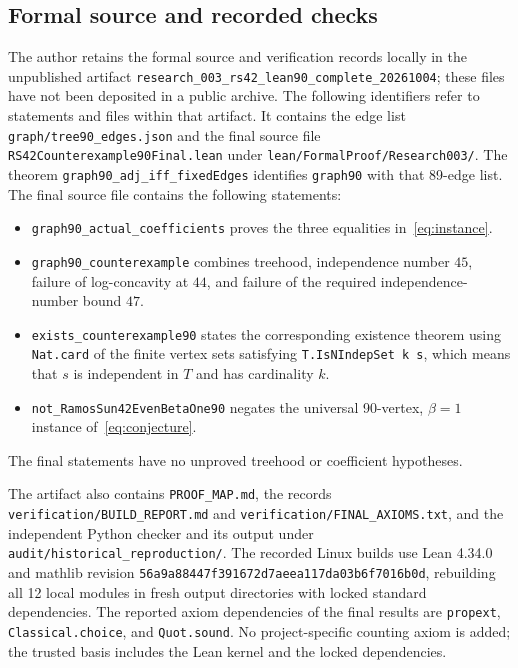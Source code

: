 \documentclass[11pt,a4paper]{article}
\theoremstyle{remark}
\numberwithin{equation}{section}
\begin{document}
\subsection{Formal source and recorded checks}\label{app:formal-record}

The author retains the formal source and verification records locally
in the unpublished artifact
\nolinkurl{research_003_rs42_lean90_complete_20261004}; these files
have not been deposited in a public archive. The following identifiers
refer to statements and files within that artifact.
It contains the edge list \nolinkurl{graph/tree90_edges.json} and
the final source file \nolinkurl{RS42Counterexample90Final.lean}
under \nolinkurl{lean/FormalProof/Research003/}.
The theorem \nolinkurl{graph90_adj_iff_fixedEdges} identifies
\nolinkurl{graph90} with that 89-edge list.
The final source file contains the following statements:
\begin{itemize}
\item \nolinkurl{graph90_actual_coefficients} proves the three
equalities in~\eqref{eq:instance}.
\item \nolinkurl{graph90_counterexample} combines treehood,
independence number $45$, failure of log-concavity at $44$, and
failure of the required independence-number bound $47$.
\item \nolinkurl{exists_counterexample90} states the corresponding
existence theorem using \nolinkurl{Nat.card} of the finite vertex
sets satisfying \texttt{T.IsNIndepSet k s}, which means that $s$
is independent in $T$ and has cardinality $k$.
\item \nolinkurl{not_RamosSun42EvenBetaOne90} negates the universal
90-vertex, $\beta=1$ instance of~\eqref{eq:conjecture}.
\end{itemize}
The final statements have no unproved treehood or coefficient
hypotheses.

The artifact also contains \nolinkurl{PROOF_MAP.md}, the records
\nolinkurl{verification/BUILD_REPORT.md} and
\nolinkurl{verification/FINAL_AXIOMS.txt}, and the independent Python
checker and its output under \nolinkurl{audit/historical_reproduction/}.
The recorded Linux builds use Lean 4.34.0 and mathlib revision
\nolinkurl{56a9a88447f391672d7aeea117da03b6f7016b0d}, rebuilding all
12 local modules in fresh output directories with locked standard
dependencies. The reported axiom dependencies of the final results
are \nolinkurl{propext}, \nolinkurl{Classical.choice}, and
\nolinkurl{Quot.sound}. No project-specific counting axiom is added;
the trusted basis includes the Lean kernel and the locked dependencies.
\end{document}
